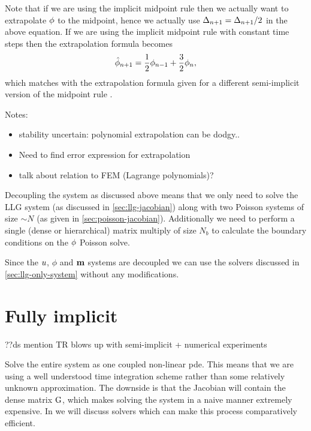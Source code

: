Note that if we are using the implicit midpoint rule then we actually want to extrapolate $\phi$ to the midpoint, hence we actually use $\Delta_{n+1} = \Delta_{n+1} /2$ in the above equation.
If we are using the implicit midpoint rule with constant time steps then the extrapolation formula becomes
\begin{equation}
  \label{eq:67}
  \hat{\phi}_{n+1} = \frac{1}{2} \phi_{n-1} + \frac{3}{2} \phi_n,
\end{equation}
which matches with the extrapolation formula given for a different semi-implicit version of the midpoint rule \cite{Serpico2001}.

Notes:
\begin{itemize}
\item stability uncertain: polynomial extrapolation can be dodgy..
\item Need to find error expression for extrapolation
\item talk about relation to FEM (Lagrange polynomials)?
\end{itemize}


Decoupling the system as discussed above means that we only need to solve the LLG system (as discussed in \cref{sec:llg-jacobian}) along with two Poisson systems of size $\sim N$ (as given in \cref{sec:poisson-jacobian}).
Additionally we need to perform a single (dense or hierarchical) matrix multiply of size $N_b$ to calculate the boundary conditions on the $\phi$ Poisson solve.


Since the $u$, $\phi$ and $\boldsymbol{\mathrm{m}}$ systems are decoupled we can use the solvers discussed in \cref{sec:llg-only-system} without any modifications.



\section{Fully implicit}
\label{sec:fully-implicit-bem}

??ds mention TR blows up with semi-implicit + numerical experiments

Solve the entire system as one coupled non-linear pde.
This means that we are using a well understood time integration scheme rather than some relatively unknown approximation.
The downside is that the Jacobian will contain the dense matrix ${\mathbf{\mathrm{G}}}$, which makes solving the system in a naive manner extremely expensive.
In  we will discuss solvers which can make this process comparatively efficient.

